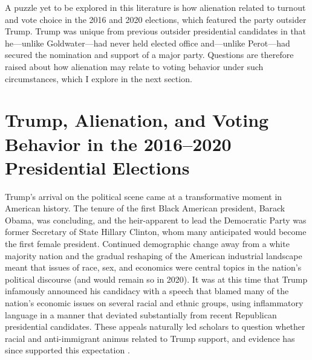\documentclass[12pt]{article}
\begin{document}
A puzzle yet to be explored in this literature is how alienation related to turnout and vote choice in the 2016 and 2020 elections, which featured the party outsider Trump. Trump was unique from previous outsider presidential candidates in that he---unlike Goldwater---had never held elected office and---unlike Perot---had secured the nomination and support of a major party. Questions are therefore raised about how alienation may relate to voting behavior under such circumstances, which I explore in the next section. 










\section*{Trump, Alienation, and Voting Behavior in the 2016--2020 Presidential Elections}\label{sec:theory}
Trump's arrival on the political scene came at a transformative moment in American history. The tenure of the first Black American president, Barack Obama, was concluding, and the heir-apparent to lead the Democratic Party was former Secretary of State Hillary Clinton, whom many anticipated would become the first female president. Continued demographic change away from a white majority nation and the gradual reshaping of the American industrial landscape meant that issues of race, sex, and economics were central topics in the nation's political discourse (and would remain so in 2020). It was at this time that Trump infamously announced his candidacy with a speech that blamed many of the nation's economic issues on several racial and ethnic groups, using inflammatory language in a manner that deviated substantially from recent Republican presidential candidates. These appeals naturally led scholars to question whether racial and anti-immigrant animus related to Trump support, and evidence has since supported this expectation \parencite{hooghe2018explaining,mutz2018status,hopkins2021activation,mason2021activating}. 
\end{document}
